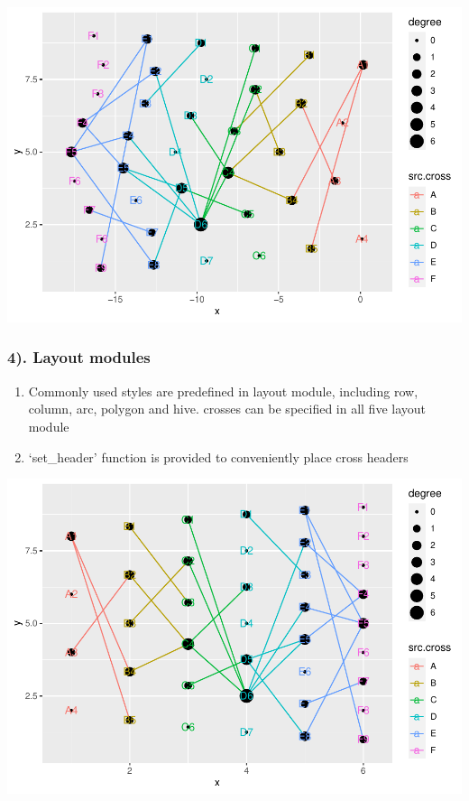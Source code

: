 \documentclass[
]{article}
\newenvironment{Shaded}{\begin{snugshade}}{\end{snugshade}}
\newcommand{\CommentTok}[1]{\textcolor[rgb]{0.56,0.35,0.01}{\textit{#1}}}
\newcommand{\KeywordTok}[1]{\textcolor[rgb]{0.13,0.29,0.53}{\textbf{#1}}}
\newcommand{\NormalTok}[1]{#1}
\newcommand{\OperatorTok}[1]{\textcolor[rgb]{0.81,0.36,0.00}{\textbf{#1}}}
\newcommand{\StringTok}[1]{\textcolor[rgb]{0.31,0.60,0.02}{#1}}
\providecommand{\tightlist}{%
  \setlength{\itemsep}{0pt}\setlength{\parskip}{0pt}}
\begin{document}
\includegraphics{ReadMe1_files/figure-latex/unnamed-chunk-6-7.pdf}

\hypertarget{layout-modules}{%
\subsubsection{4). Layout modules}\label{layout-modules}}

\begin{enumerate}
\def\labelenumi{\alph{enumi}.}
\tightlist
\item
  Commonly used styles are predefined in layout module, including row,
  column, arc, polygon and hive. crosses can be specified in all five
  layout module
\item
  `set\_header' function is provided to conveniently place cross headers
\end{enumerate}

\begin{Shaded}
\end{Shaded}

\includegraphics{ReadMe1_files/figure-latex/unnamed-chunk-7-1.pdf}
\end{document}
